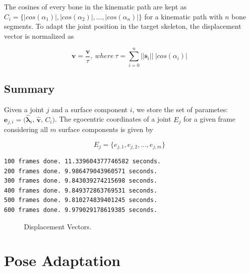 \documentclass{vgtc}
\begin{document}
The cosines of every bone in the kinematic path are kept as
\(C_{i} = \{|cos(\alpha_{1})|, |cos(\alpha_{2})|,..., |cos(\alpha_{n})|\}\)
for a kinematic path with \(n\) bone segments. To adapt the joint
position in the target skeleton, the displacement vector is normalized
as

\begin{equation}
\label{eq:tau}
\mathbf{\hat{v}} = \frac{\mathbf{v}}{\tau},\ where\ \tau = \sum_{i=0}^{n}||\mathbf{s}_{i}||\ |cos(\alpha_{i})|
\end{equation}

\subsection{Summary}\label{summary}

Given a joint \(j\) and a surface component \(i\), we store the set of
parametes: \(\mathbf{e}_{j,i} = (\mathbf{\hat{\lambda}}_{i}\),
\(\mathbf{\hat{v}}\), \(C_{i})\). The egocentric coordinates of a joint
\(E_{j}\) for a given frame considering all \(m\) surface components is
given by

\begin{equation}
\label{eq:egocoordsall}
E_{j} = \{e_{j,1}, e_{j,2},...,e_{j,m}\}
\end{equation}



    \begin{Verbatim}[commandchars=\\\{\}]
100 frames done. 11.339604377746582 seconds.
200 frames done. 9.986479043960571 seconds.
300 frames done. 9.843039274215698 seconds.
400 frames done. 9.849372863769531 seconds.
500 frames done. 9.810274839401245 seconds.
600 frames done. 9.979029178619385 seconds.

    \end{Verbatim}


    \begin{figure}
        \begin{center}\end{center}
        \caption{Displacement Vectors.}
        \label{fig:dispvectors}
    \end{figure}
    
    \section{Pose Adaptation}\label{pose-adaptation}
\end{document}
